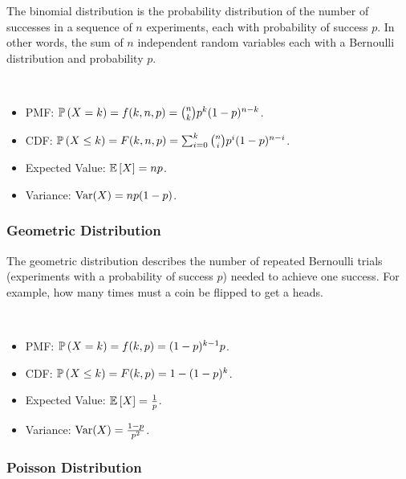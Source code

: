 \documentclass[english, course]{Notes}
\begin{document}
\begin{remark}
The binomial distribution is the probability distribution of the number of successes in a sequence of $n$ experiments, each with probability of success $p$. In other words, the sum of $n$ independent random variables each with a Bernoulli distribution and probability $p$. 
\end{remark}

\begin{fact}\ \\
\begin{itemize}
	\item PMF: $\mathbb{P}\left(X = k\right) = f(k, n, p) = {n \choose k} p^k (1-p)^{n-k}$.
	\item CDF: $\mathbb{P}\left(X \leq k\right) = F(k, n, p) = \sum_{i = 0}^k {n \choose i}p^i(1-p)^{n-i}$.
	\item Expected Value: $\mathbb{E}\left[X\right] = np$.
	\item Variance: $\operatorname{Var}(X) = np(1-p)$.
\end{itemize}
\end{fact}

\subsubsection{Geometric Distribution}

\begin{remark}
The geometric distribution describes the number of repeated Bernoulli trials (experiments with a probability of success $p$) needed to achieve one success. For example, how many times must a coin be flipped to get a heads. 
\end{remark}

\begin{fact}\ \\
	\begin{itemize}
		\item PMF: $\mathbb{P}\left(X = k\right) = f(k, p) = (1-p)^{k-1}p$.
		\item CDF: $\mathbb{P}\left(X \leq k\right) = F(k, p) = 1 - (1 - p)^k$.
		\item Expected Value: $\mathbb{E}\left[X\right] = \frac{1}{p}$.
		\item Variance: $\operatorname{Var}(X) = \frac{1-p}{p^2}$.
	\end{itemize}
\end{fact}

\subsubsection{Poisson Distribution}
\end{document}
